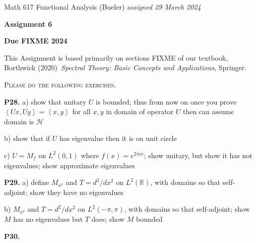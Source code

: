 \documentclass[12pt]{amsart}
\newcommand{\cH}{\mathcal{H}}
\newcommand{\RR}{\mathbb{R}}
\newcommand{\ip}[2]{\ensuremath{\left<#1,#2\right>}}
\newcommand{\prob}[1]{\bigskip\noindent\textbf{#1.}\quad }
\begin{document}
\scriptsize \noindent Math 617 Functional Analysis (Bueler) \hfill \emph{assigned 29 March 2024}
\normalsize\medskip

\Large\centerline{\textbf{Assignment 6}}
\large
\medskip

\centerline{\textbf{Due FIXME 2024}}
\medskip
\normalsize

\thispagestyle{empty}

\bigskip
\noindent This Assignment is based primarily on sections FIXME of our textbook, Borthwick (2020)~\emph{Spectral Theory: Basic Concepts and Applications}, Springer.

\medskip
\noindent \textsc{Please do the following exercises.}
\smallskip


\prob{P28}  a) show that unitary $U$ is bounded; thus from now on once you prove $\ip{Ux}{Uy}=\ip{x}{y}$ for all $x,y$ in domain of operator $U$ then can assume domain is $\cH$

b) show that if $U$ has eigenvalue then it is on unit circle

c) $U=M_f$ on $L^2(0,1)$ where $f(x) = e^{2\pi i x}$; show unitary, but show it has not eigenvalues; show approximate eigenvalues


\prob{P29}  a) define $M_{x^2}$ and $T=d^2/dx^2$ on $L^2(\RR)$, with domains so that self-adjoint; show they have no eigenvalues

b) $M_{x^2}$ and $T=d^2/dx^2$ on $L^2(-\pi,\pi)$, with domains so that self-adjoint; show $M$ has no eigenvalues but $T$ does; show $M$ bounded


\prob{P30}  
\end{document}
